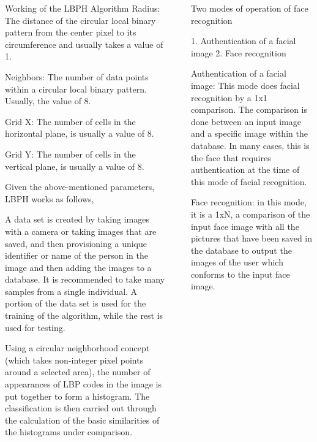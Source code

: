 \documentclass[final]{beamer}
\newlength{\sepwidth}
\newlength{\colwidth}
\newcommand{\separatorcolumn}{\begin{column}{\sepwidth}\end{column}}
\begin{document}
\begin{frame}[t]
\begin{columns}[t]
\begin{column}{\colwidth}
\begin{block}{Working of the LBPH Algorithm}
Radius: The distance of the circular local binary pattern from the center pixel to its circumference and usually takes a value of 1.

Neighbors: The number of data points within a circular local binary pattern. Usually, the value of 8.

Grid X: The number of cells in the horizontal plane, is usually a value of 8.

Grid Y: The number of cells in the vertical plane, is usually a value of 8.

Given the above-mentioned parameters, LBPH works as follows,

A data set is created by taking images with a camera or taking images that are saved, and then provisioning a unique identifier or name of the person in the image and then adding the images to a database. It is recommended to take many samples from a single individual. A portion of the data set is used for the training of the algorithm, while the rest is used for testing.

Using a circular neighborhood concept (which takes non-integer pixel points around a selected area), the number of appearances of LBP codes in the image is put together to form a histogram. The classification is then carried out through the calculation of the basic similarities of the histograms under comparison.



  \end{block}

\end{column}

\separatorcolumn

\begin{column}{\colwidth}

  \begin{block}{Two modes of operation of face recognition}


{1. Authentication of a facial image} \newline
{2. Face recognition} 


Authentication of a facial image: This mode does facial recognition by a 1x1 comparison. The comparison is done between an input image and a specific image within the database. In many cases, this is the face that requires authentication at the time of this mode of facial recognition.

Face recognition: in this mode, it is a 1xN, a comparison of the input face image with all the pictures that have been saved in the database to output the images of the user which conforms to the input face image.






\end{block}
\end{column}
\end{columns}
\end{frame}
\end{document}
